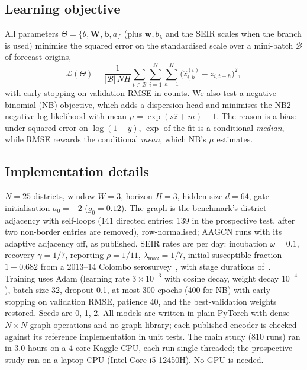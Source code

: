 \subsection{Learning objective}
\label{sec:loss}
All parameters $\Theta=\{\theta,\mathbf{W},\mathbf{b},a\}$ (plus $\mathbf{w},b_\lambda$
and the SEIR scales when the branch is used) minimise the squared error on the
standardised scale over a mini-batch $\mathcal{B}$ of forecast origins,
\begin{equation}
  \mathcal{L}(\Theta)=\frac{1}{|\mathcal{B}|\,N H}\sum_{t\in\mathcal{B}}\sum_{i=1}^{N}
  \sum_{h=1}^{H}\big(\hat z_{i,h}^{(t)}-z_{i,t+h}\big)^2 ,
\end{equation}
with early stopping on validation RMSE in counts. We also test a negative-binomial
(NB) objective, which adds a dispersion head and minimises the NB2 negative
log-likelihood with mean $\mu=\exp(s\hat z+m)-1$. The reason is a bias: under squared
error on $\log(1+y)$, $\exp$ of the fit is a conditional \emph{median}, while RMSE
rewards the conditional \emph{mean}, which NB's $\mu$ estimates.

\subsection{Implementation details}
\label{sec:impl}
$N=25$ districts, window $W=3$, horizon $H=3$, hidden size $d=64$, gate initialisation
$a_0=-2$ ($g_0=0.12$). The graph is the benchmark's district adjacency with
self-loops (141 directed entries; 139 in the prospective test, after two
non-border entries are removed), row-normalised; AAGCN runs with its adaptive
adjacency off, as published. SEIR rates are per day: incubation $\omega=0.1$, recovery
$\gamma=1/7$, reporting $\rho=1/11$, $\lambda_{\max}=1/7$, initial susceptible
fraction $1-0.682$ from a 2013--14 Colombo serosurvey~\cite{jeewandara2015seroprevalence}, with stage durations
of~\cite{phaijoo2018sensitivity}. Training uses Adam (learning rate
$3\times10^{-3}$ with cosine decay, weight decay $10^{-4}$), batch size 32, dropout 0.1, at most 300
epochs (400 for NB) with early stopping on validation RMSE, patience 40, and the
best-validation weights restored. Seeds are 0, 1, 2. All models are written in plain
PyTorch with dense $N\times N$ graph operations and no graph library; each published
encoder is checked against its reference implementation in unit tests. The main
study (810 runs) ran in 3.0 hours on a 4-core Kaggle CPU, each run single-threaded;
the prospective study ran on a laptop CPU (Intel Core i5-12450H). No GPU is needed.
